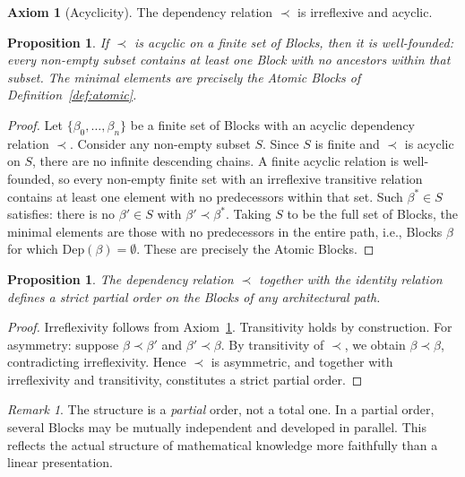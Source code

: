 \documentclass[12pt, a4paper]{article}
\theoremstyle{plain}
\newtheorem{proposition}[theorem]{Proposition}
\theoremstyle{definition}
\newtheorem{axiom}[theorem]{Axiom}
\theoremstyle{remark}
\newtheorem{remark}[theorem]{Remark}
\begin{document}
\begin{axiom}[Acyclicity]
\label{ax:acyclic}
The dependency relation $\prec$ is irreflexive and acyclic.
\end{axiom}

\begin{proposition}
\label{prop:wellfounded}
If $\prec$ is acyclic on a finite set of Blocks, then it is
well-founded: every non-empty subset contains at least one Block
with no ancestors within that subset. The minimal elements are
precisely the Atomic Blocks of
Definition~\ref{def:atomic}.
\end{proposition}

\begin{proof}
Let $\{\beta_0,\ldots,\beta_n\}$ be a finite set of Blocks with
an acyclic dependency relation $\prec$. Consider any non-empty
subset $S$. Since $S$ is finite and $\prec$ is acyclic on $S$,
there are no infinite descending chains. A finite acyclic
relation is well-founded, so every non-empty finite set with an
irreflexive transitive relation contains at least one element
with no predecessors within that set. Such $\beta^* \in S$
satisfies: there is no $\beta' \in S$ with $\beta' \prec
\beta^*$. Taking $S$ to be the full set of Blocks, the minimal
elements are those with no predecessors in the entire path,
i.e., Blocks $\beta$ for which $\mathrm{Dep}(\beta) = \emptyset$.
These are precisely the Atomic Blocks.
\end{proof}

\begin{proposition}
\label{prop:partial-order}
The dependency relation $\prec$ together with the identity
relation defines a strict partial order on the Blocks of any
architectural path.
\end{proposition}

\begin{proof}
Irreflexivity follows from Axiom~\ref{ax:acyclic}. Transitivity
holds by construction. For asymmetry: suppose $\beta \prec \beta'$
and $\beta' \prec \beta$. By transitivity of $\prec$, we obtain
$\beta \prec \beta$, contradicting irreflexivity. Hence $\prec$
is asymmetric, and together with irreflexivity and transitivity,
constitutes a strict partial order.
\end{proof}

\begin{remark}
The structure is a \emph{partial} order, not a total one. In a
partial order, several Blocks may be mutually independent and
developed in parallel. This reflects the actual structure of
mathematical knowledge more faithfully than a linear presentation.
\end{remark}
\end{document}
